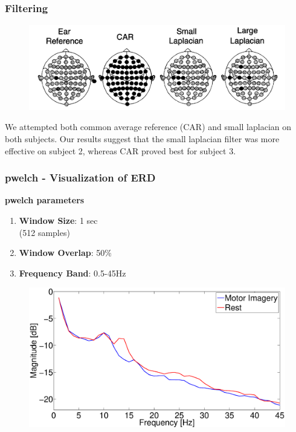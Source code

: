 \documentclass{beamer}
\begin{document}
\begin{frame}
	\frametitle{Filtering}
	\begin{figure}
		\includegraphics[width=0.8\linewidth]{fig/filter}
	\end{figure}
	We attempted both common average reference (CAR) and small laplacian on both subjects. Our results suggest that the small laplacian filter was more effective on subject 2, whereas CAR proved best for subject 3. \cite{e1}
\end{frame}

\begin{frame}
\frametitle{pwelch - Visualization of ERD}

\textbf{pwelch parameters}
\begin{enumerate}
\item \textbf{Window Size}: 1 sec \\(512 samples)
\item \textbf{Window Overlap}: 50$ \% $
\item \textbf{Frequency Band}: 0.5-45Hz
\end{enumerate}

\begin{figure}
	\includegraphics[width=0.8\linewidth]{fig/S6_psdVIS.eps}
\end{figure}
\end{frame}
\end{document}
